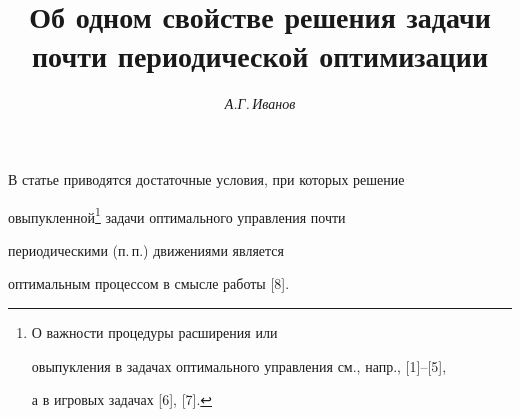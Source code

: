 

\setcounter{page}{13}















\author{\it А.Г.\,Иванов}




\title{Об одном свойстве решения задачи\\ 


почти периодической оптимизации}





\date{}




\pagestyle{plain} %







\maketitle


\label{begin}





\setcounter{section}{1}





В статье приводятся достаточные условия, при которых решение 


овыпукленной\footnote{О важности процедуры расширения или 


овыпукления в задачах оптимального управления см., напр., [1]--[5],


а в игровых задачах [6], [7].} задачи оптимального управления почти


периодическими (п.\,п.) движениями является


оптимальным процессом в смысле работы [8].


\medskip





